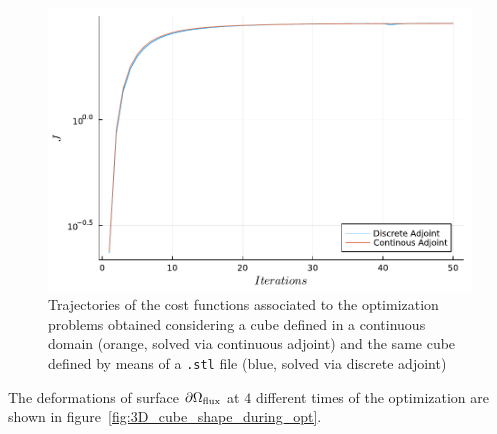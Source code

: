 \begin{figure}
	\centering
	\includegraphics[width=.5\textwidth]{img/cost_vs_iter_3D_discrete_vs_continuous_adjoint}
	\caption{Trajectories of the cost functions associated to the optimization problems obtained considering a cube defined in a continuous domain (orange, solved via continuous adjoint) and the same cube defined by means of a \texttt{.stl} file (blue, solved via discrete adjoint)}
	\label{fig:opt_history_3D}
\end{figure}

The deformations of surface $\partial\Omega_\textup{flux}$ at $4$ different times of the optimization are shown in figure~\ref{fig:3D_cube_shape_during_opt}.

